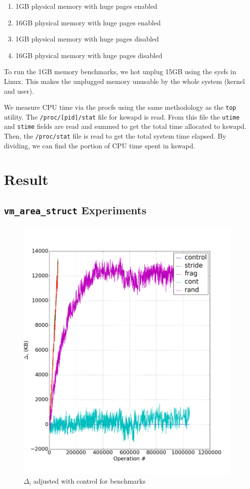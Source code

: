 \documentclass[twocolumn,11pt]{article}
\begin{document}
\begin{enumerate}
    \item 1GB physical memory with huge pages enabled
    \item 16GB physical memory with huge pages enabled
    \item 1GB physical memory with huge pages disabled
    \item 16GB physical memory with huge pages disabled
\end{enumerate}

To run the 1GB memory benchmarks, we hot unplug 15GB using the sysfs in Linux.
This makes the unplugged memory unusable by the whole system (kernel and user).

We measure CPU time via the procfs using the same methodology as the
\texttt{top} utility. The \texttt{/proc/[pid]/stat} file for kswapd is read.
From this file the \texttt{utime} and \texttt{stime} fields are read and summed
to get the total time allocated to kswapd. Then, the \texttt{/proc/stat} file is
read to get the total system time elapsed. By dividing, we can find the portion
of CPU time spent in kswapd.

\section{Result}

\subsection{\texttt{vm\_area\_struct} Experiments}

\begin{figure}
    \includegraphics[width=\columnwidth]{figures/memory_controled}
    \caption{$\Delta_i$ adjusted with control for benchmarks}
\end{figure}
\end{document}
